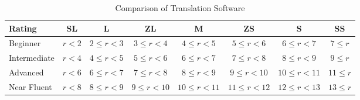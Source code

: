 \begin{table}
\centering
\caption{Comparison of Translation Software}
\label{tbl:ratings}
\begin{tabu} to \textwidth{|l|c|c|c|c|c|c|c|}
\hline
\textbf{Rating} & \textbf{SL}      & \textbf{L}       & \textbf{ZL}   & \textbf{M}    & \textbf{ZS}   & \textbf{S}  & \textbf{SS}   \\ \hline
Beginner                  & $ r < 2 $ & $ 2 \leq r < 3 $ & $ 3 \leq r < 4 $ & $ 4 \leq r < 5 $ & $ 5 \leq r < 6 $  & $ 6 \leq r < 7 $ & $ 7 \leq r $    \\ \hline
Intermediate              & $ r < 4 $ & $ 4 \leq r < 5 $ & $ 5 \leq r < 6 $ & $ 6 \leq r < 7 $ & $ 7 \leq r < 8 $  & $ 8 \leq r < 9 $ & $ 9 \leq r $    \\ \hline
Advanced                  & $ r < 6 $ & $ 6 \leq r < 7 $ & $ 7 \leq r < 8 $ & $ 8 \leq r < 9 $ & $ 9 \leq r < 10 $  & $ 10 \leq r < 11 $ & $ 11 \leq r $    \\ \hline
Near Fluent             & $ r < 8 $ & $ 8 \leq r < 9 $ & $ 9 \leq r < 10 $ & $ 10 \leq r < 11 $ & $ 11 \leq r < 12 $  & $ 12 \leq r < 13 $ & $ 13 \leq r $    \\ \hline
\end{tabu}
\end{table}
